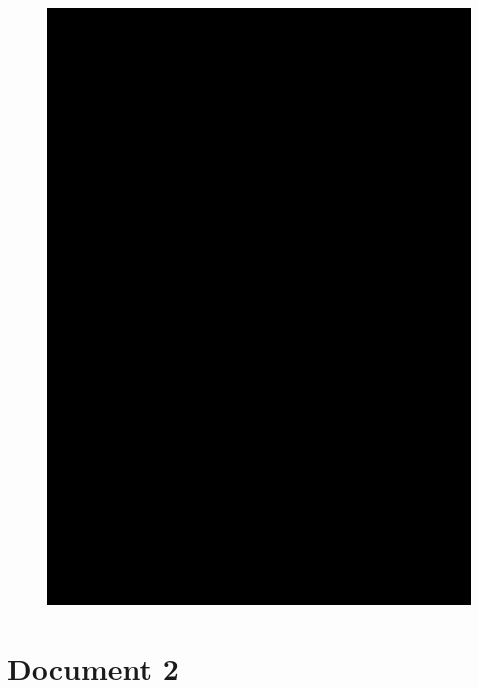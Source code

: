 \newpage
\begin{figure}[H]
\centering
\includegraphics[width=0.9\linewidth]{doc/john/Document_2.pdf}
\end{figure}
\section{Document 2}

